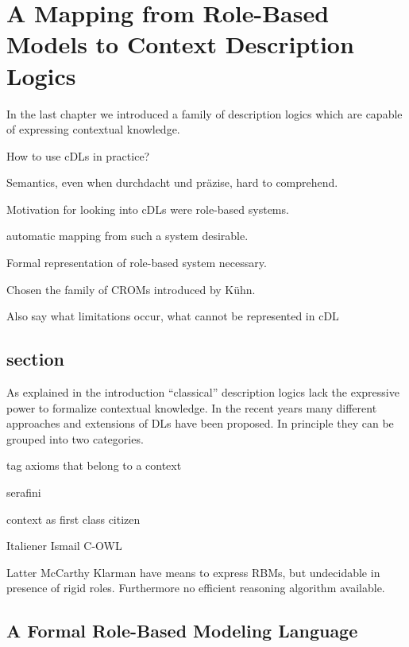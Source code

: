 
\chapter{A Mapping from Role-Based Models to Context Description Logics}
\label{cha:mapping}

In the last chapter we introduced a family of description logics which are capable of expressing
contextual knowledge. 

 

How to use cDLs in practice?

Semantics, even when durchdacht und präzise, hard to comprehend.

Motivation for looking into cDLs were role-based systems.

automatic mapping from such a system desirable.

Formal representation of role-based system necessary.

Chosen the family of CROMs introduced by Kühn.

Also say what limitations occur, what cannot be represented in cDL



\section{section}
\label{sec:section}

As explained in the introduction ``classical'' description logics lack the expressive power to
formalize contextual knowledge. In the recent years many different approaches and extensions of DLs
have been proposed. In principle they can be grouped into two categories. 

tag axioms that belong to a context

serafini





context as first class citizen


Italiener Ismail C-OWL



Latter McCarthy Klarman
 have means to express RBMs, but undecidable in presence of rigid roles. Furthermore no efficient
 reasoning algorithm available.



\section{A Formal Role-Based Modeling Language}
\label{sec:sigma-crom}


